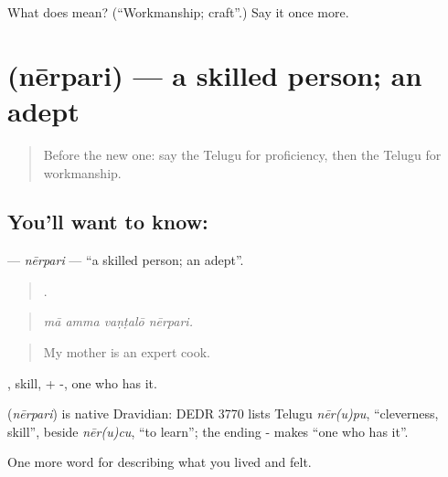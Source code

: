 \begin{tcolorbox}[breakable,colback=teal!4,colframe=teal!35!black,title={Before you move on}]
What does  mean? (\textquotedblleft{}Workmanship; craft\textquotedblright{}.) Say it once more.
\end{tcolorbox}
\section[\texorpdfstring{\te{నేర్పరి} (nērpari)}{నేర్పరి (nērpari)}]{ (nērpari) — a skilled person; an adept}

\label{lesson:TE-C524-nerpari}



\begin{quote}
Before the new one: say the Telugu for proficiency, then the Telugu for workmanship.
\end{quote}

\subsection*{You'll want to know: }
\textbf{} — \emph{nērpari} — \textquotedblleft{}a skilled person; an adept\textquotedblright{}.

\begin{quote}
   .
\end{quote}

\begin{quote}
\emph{mā amma vaṇṭalō nērpari.}
\end{quote}

\begin{quote}
My mother is an expert cook.
\end{quote}

, skill, + -, one who has it.

\begin{cousinweb}
\textbf{} (\emph{nērpari}) is native Dravidian: DEDR 3770 lists Telugu \emph{nēr(u)pu}, \textquotedblleft{}cleverness, skill\textquotedblright{}, beside \emph{nēr(u)cu}, \textquotedblleft{}to learn\textquotedblright{}; the ending - makes \textquotedblleft{}one who has it\textquotedblright{}.
\end{cousinweb}

\begin{grammarlens}[title={What you've built}]
One more word for describing what you lived and felt.
\end{grammarlens}

